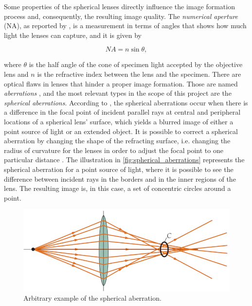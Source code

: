 Some properties of the spherical lenses directly influence the image formation process and, consequently, the resulting image quality. The \emph{numerical aperture} (NA), as reported by , is a measurement in terms of angles that shows how much light the lenses can capture, and it is given by

\begin{equation}
    \label{eqn:numerical_aperture}
    NA = n \sin{\theta},
\end{equation}

\noindent where $\theta$ is the half angle of the cone of specimen light accepted by the objective lens and $n$ is the refractive index between the lens and the specimen. There are optical flaws in lenses that hinder a proper image formation. Those are named \emph{aberrations} \cite{lawlor2019introduction}, and the most relevant types in the scope of this project are the \emph{spherical aberrations}. According to , the spherical aberrations occur when there is a difference in the focal point of incident parallel rays at central and peripheral locations of a spherical lens' surface, which yields a blurred image of either a point source of light or an extended object. It is possible to correct a spherical aberration by changing the shape of the refracting surface, i.e. changing the radius of curvature for the lenses in order to adjust the focal point to one particular distance \cite{smith1988optics}. The illustration in \autoref{fig:spherical_aberrations} represents the spherical aberration for a point source of light, where it is possible to see the difference between incident rays in the borders and in the inner regions of the lens. The resulting image is, in this case, a set of concentric circles around a point.

\begin{figure}[htb]
	\centering
	\caption{\label{fig:spherical_aberrations} Arbitrary example of the spherical aberration.}
	\begin{center}
	    \includegraphics[scale=1.5]{images/spherical_aberration.png}
	\end{center}
	\centering
\end{figure}

\vspace{-1cm}